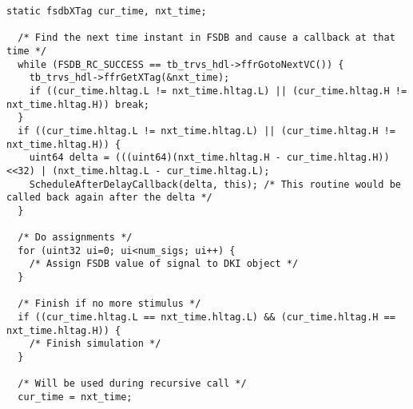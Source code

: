\lstset{language=C++,
basicstyle=\footnotesize,
frame=shadowbox,
breaklines=true}          
\begin{lstlisting}[frame=single, caption=Stimulus Applicator Routine,label=nl:dualsim:sar] 
  static fsdbXTag cur_time, nxt_time;

  /* Find the next time instant in FSDB and cause a callback at that time */
  while (FSDB_RC_SUCCESS == tb_trvs_hdl->ffrGotoNextVC()) {
    tb_trvs_hdl->ffrGetXTag(&nxt_time);
    if ((cur_time.hltag.L != nxt_time.hltag.L) || (cur_time.hltag.H != nxt_time.hltag.H)) break;
  }
  if ((cur_time.hltag.L != nxt_time.hltag.L) || (cur_time.hltag.H != nxt_time.hltag.H)) {
    uint64 delta = (((uint64)(nxt_time.hltag.H - cur_time.hltag.H))<<32) | (nxt_time.hltag.L - cur_time.hltag.L);
    ScheduleAfterDelayCallback(delta, this); /* This routine would be called back again after the delta */
  }

  /* Do assignments */
  for (uint32 ui=0; ui<num_sigs; ui++) {
    /* Assign FSDB value of signal to DKI object */
  }

  /* Finish if no more stimulus */
  if ((cur_time.hltag.L == nxt_time.hltag.L) && (cur_time.hltag.H == nxt_time.hltag.H)) {
    /* Finish simulation */
  }

  /* Will be used during recursive call */
  cur_time = nxt_time;
\end{lstlisting}

%
%
%


